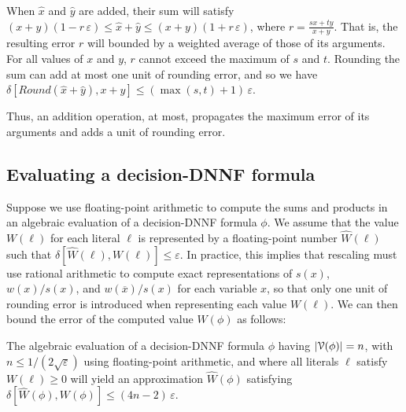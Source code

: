 \documentclass[letterpaper,USenglish,cleveref, autoref, thm-restate]{lipics-v2021}
\newcommand{\obar}[1]{\overline{#1}}
\newcommand{\lit}{\ell}
\newcommand{\approximate}[1]{\hat{#1}}
\newcommand{\approxx}{\approximate{x}}
\newcommand{\approxy}{\approximate{y}}
\newcommand{\approxW}{\approximate{W}}
\newcommand{\round}{\mathit{Round}}
\newcommand{\aerror}{\delta}
\newcommand{\roundepsilon}{\varepsilon}
\newcommand{\dependencyset}{{\cal V}}
\begin{document}
When $\approxx$ and $\approxy$ are added, their sum will satisfy
$(x + y) (1 - r\,\roundepsilon) \leq \approxx + \approxy \leq (x + y) (1 + r\,\roundepsilon)$, where $r = \frac{sx + ty}{x+y}$.  That is, the resulting error $r$ will bounded by a weighted average
of those of its arguments.  For all values of $x$ and $y$, $r$ cannot exceed the maximum of $s$ and $t$.
Rounding the sum can add at most one unit of rounding error, and so we have
$\aerror[\round(\approxx + \approxy), x + y] \leq (\max(s,t)+1)\,\roundepsilon$.

Thus, an addition operation, at most, propagates the maximum error of its arguments and adds a unit of rounding error.

\subsection{Evaluating a decision-DNNF formula}
\label{sect:error:formula}

Suppose we use floating-point arithmetic to compute the sums and
products in an algebraic evaluation of a decision-DNNF formula $\phi$.
We assume that the value $W(\lit)$ for each literal $\lit$ is
represented by a floating-point number $\approxW(\lit)$ such that
$\aerror[\approxW(\lit), W(\lit)] \leq \roundepsilon$.  In practice,
this implies that rescaling must use rational arithmetic to
compute exact representations of $s(x)$, $w(x)/s(x)$, and
$w(\obar{x})/s(x)$ for each variable $x$, so that only one unit of
rounding error is introduced when representing each value $W(\lit)$.
We can then bound the error of the computed value $W(\phi)$ as follows:
\begin{lemma}
  The algebraic evaluation of a decision-DNNF formula $\phi$  having $|\dependencyset(\phi)| = n$, with $n \leq 1/(2\sqrt{\roundepsilon})$ using floating-point arithmetic,
  and where all literals $\ell$ satisfy $W(\lit) \geq 0$
  will yield an approximation $\approxW(\phi)$ satisfying
  $\aerror[\approxW(\phi), W(\phi)] \leq (4n-2)\,\roundepsilon$.
  \label{lemma:approx:pos}
\end{lemma}
\end{document}
